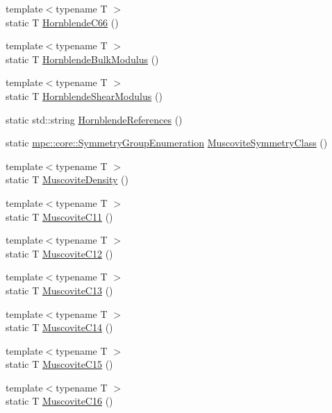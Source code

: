 \begin{DoxyCompactItemize}
{\footnotesize template$<$typename T $>$ }\\static T \mbox{\hyperlink{namespacempc_1_1data_a860769512fd43c6be02bb0b4a57c0f48}{Hornblende\+C66}} ()
\item 
{\footnotesize template$<$typename T $>$ }\\static T \mbox{\hyperlink{namespacempc_1_1data_a3592b863aa9d9a1a38530696f943daf9}{Hornblende\+Bulk\+Modulus}} ()
\item 
{\footnotesize template$<$typename T $>$ }\\static T \mbox{\hyperlink{namespacempc_1_1data_aae71d499b1bca11ddede811581172401}{Hornblende\+Shear\+Modulus}} ()
\item 
static std\+::string \mbox{\hyperlink{namespacempc_1_1data_a89ebcb7bd821af1b5628166d84e835c0}{Hornblende\+References}} ()
\item 
static \mbox{\hyperlink{namespacempc_1_1core_a9d979684062547055a0ef5c13077bad8}{mpc\+::core\+::\+Symmetry\+Group\+Enumeration}} \mbox{\hyperlink{namespacempc_1_1data_a4eca1734b2c5e996daf9e48a3dc73126}{Muscovite\+Symmetry\+Class}} ()
\item 
{\footnotesize template$<$typename T $>$ }\\static T \mbox{\hyperlink{namespacempc_1_1data_a1651103d3745f7ac1765398e11555d33}{Muscovite\+Density}} ()
\item 
{\footnotesize template$<$typename T $>$ }\\static T \mbox{\hyperlink{namespacempc_1_1data_a203d3b7c4b3a16dd0875f4529cd37eb6}{Muscovite\+C11}} ()
\item 
{\footnotesize template$<$typename T $>$ }\\static T \mbox{\hyperlink{namespacempc_1_1data_ac80f0e449af23bb7f9486b84c0977843}{Muscovite\+C12}} ()
\item 
{\footnotesize template$<$typename T $>$ }\\static T \mbox{\hyperlink{namespacempc_1_1data_a44274ac9316d5a358cc0525931cf685f}{Muscovite\+C13}} ()
\item 
{\footnotesize template$<$typename T $>$ }\\static T \mbox{\hyperlink{namespacempc_1_1data_a693592b2831d05c77efadb72899f8466}{Muscovite\+C14}} ()
\item 
{\footnotesize template$<$typename T $>$ }\\static T \mbox{\hyperlink{namespacempc_1_1data_a1bc5ce35e2ccafd1b037989ff055ba54}{Muscovite\+C15}} ()
\item 
{\footnotesize template$<$typename T $>$ }\\static T \mbox{\hyperlink{namespacempc_1_1data_adb6cdc3b5eca19baf752048f96d679f1}{Muscovite\+C16}} ()

\end{DoxyCompactItemize}
